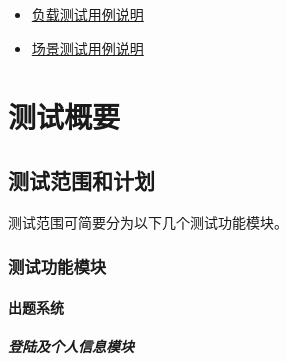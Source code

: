 \documentclass[hyperref, a4paper]{ctexart}
\let\oldparagraph\paragraph
\renewcommand{\paragraph}[1]{\oldparagraph{#1}\mbox{}}
\let\oldsubparagraph\subparagraph
\renewcommand{\subparagraph}[1]{\oldsubparagraph{#1}\mbox{}}
\begin{document}
\begin{itemize}
\item
  \href{https://github.com/StrayBird-ATSH/SoftwareQA-Testing/blob/master/lab6/lab6.pdf}{负载测试用例说明}
\item
  \href{https://github.com/StrayBird-ATSH/SoftwareQA-Testing/blob/master/lab8/lab8.md}{场景测试用例说明}
\end{itemize}

\hypertarget{ux6d4bux8bd5ux6982ux8981}{%
\section{测试概要}\label{ux6d4bux8bd5ux6982ux8981}}

\hypertarget{ux6d4bux8bd5ux8303ux56f4ux548cux8ba1ux5212}{%
\subsection{测试范围和计划}\label{ux6d4bux8bd5ux8303ux56f4ux548cux8ba1ux5212}}

测试范围可简要分为以下几个测试功能模块。

\hypertarget{ux6d4bux8bd5ux529fux80fdux6a21ux5757}{%
\subsubsection{测试功能模块}\label{ux6d4bux8bd5ux529fux80fdux6a21ux5757}}

\hypertarget{ux51faux9898ux7cfbux7edf-1}{%
\paragraph{出题系统}\label{ux51faux9898ux7cfbux7edf-1}}

\hypertarget{ux767bux9646ux53caux4e2aux4ebaux4fe1ux606fux6a21ux5757}{%
\subparagraph{登陆及个人信息模块}\label{ux767bux9646ux53caux4e2aux4ebaux4fe1ux606fux6a21ux5757}}
\end{document}
